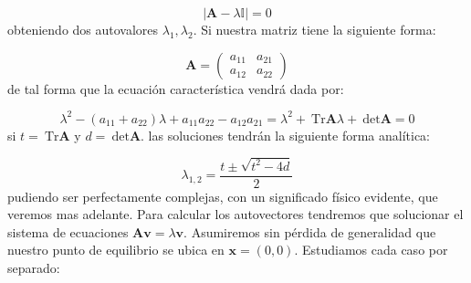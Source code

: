 \documentclass[12pt,a4paper]{article}
\numberwithin{equation}{section}
\numberwithin{figure}{section}
\newcommand{\dete}{\ \mathrm{det}}
\newcommand{\Tr}{\ \mathrm{Tr}}
\newcommand{\vn}{\mathbf{v}}
\newcommand{\xn}{\mathbf{x}}
\newcommand{\An}{\mathbf{A}}
\begin{document}
\begin{equation}
| \An - \lambda \mathbb{I} | = 0
\end{equation}
obteniendo dos autovalores $\lambda_1,\lambda_2$. Si nuestra matriz tiene la siguiente forma:

\begin{equation}
\An = \begin{pmatrix}
a_{11} & a_{21} \\
a_{12} & a_{22}
\end{pmatrix}
\end{equation}
de tal forma que la ecuación característica vendrá dada por:

\begin{equation}
\lambda^2 - (a_{11}+a_{22}) \lambda + a_{11} a_{22} - a_{12} a_{21} = \lambda^2 + \Tr  \An \lambda + \dete \An = 0
\end{equation}
si $t = \Tr \An$ y $d = \dete \An$. las soluciones tendrán la siguiente forma analítica:

\begin{equation}
\lambda_{1,2} =  \dfrac{t \pm \sqrt{t^2 - 4 d}}{2}
\end{equation}
pudiendo ser perfectamente complejas, con un significado físico evidente, que veremos mas adelante. Para calcular los autovectores tendremos que solucionar el sistema de ecuaciones $\An \vn = \lambda \vn$. Asumiremos sin pérdida de generalidad que nuestro punto de equilibrio se ubica en $\xn = (0,0)$. Estudiamos cada caso por separado:
\end{document}

